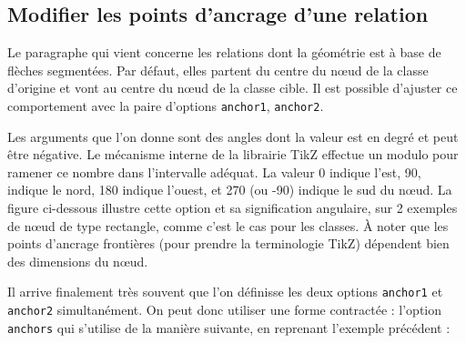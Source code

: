 \documentclass[a4paper,11pt]{report}
\newcommand{\inputTikZ}[1]{%
  }%
\newcommand{\inputTikZ}[1]{%
    \texttt{[image: fig/\#1.pdf]}%
  }%
\newcommand{\TikZ}{{\sc TikZ}}
\begin{document}
\subsection{Modifier les points d'ancrage d'une relation}\label{ss.relanchor}

Le paragraphe qui vient concerne les relations dont la géométrie est à base de flèches segmentées. Par défaut, elles partent du centre du n\oe{}ud de la classe d'origine et vont au centre du n\oe{}ud de la classe cible. Il est possible d'ajuster ce comportement avec la paire d'options \hypertarget{anchor1}{{\tt anchor1}}, \hypertarget{anchor2}{{\tt anchor2}}.

\medskip

\begin{minipage}{0.6\textwidth}

\end{minipage}
\begin{minipage}{0.4\textwidth}
\begin{center}
\inputTikZ{relationanchor}
\end{center}
\end{minipage}

\medskip

Les arguments que l'on donne sont des angles dont la valeur est en degré et peut être négative. Le mécanisme interne de la librairie \TikZ{} effectue un modulo pour ramener ce nombre dans l'intervalle adéquat. La valeur 0 indique l'est, 90, indique le nord, 180 indique l'ouest, et 270 (ou -90) indique le sud du n\oe{}ud. La figure ci-dessous illustre cette option et sa signification angulaire, sur 2 exemples de n\oe{}ud de type rectangle, comme c'est le cas pour les classes. \`{A} noter que les points d'ancrage frontières (pour prendre la terminologie \TikZ) dépendent bien des dimensions du n\oe{}ud.

\begin{center}
\inputTikZ{tikzanchor}
\end{center}

Il arrive finalement très souvent que l'on définisse les deux options {\tt anchor1} et {\tt anchor2} simultanément. On peut donc utiliser une forme contractée : l'option \hypertarget{anchors}{{\tt anchors}} qui s'utilise de la manière suivante, en reprenant l'exemple précédent :

\medskip

\begin{minipage}{0.6\textwidth}

\end{minipage}
\begin{minipage}{0.4\textwidth}
\begin{center}
\inputTikZ{relationanchors}
\end{center}
\end{minipage}
\end{document}
